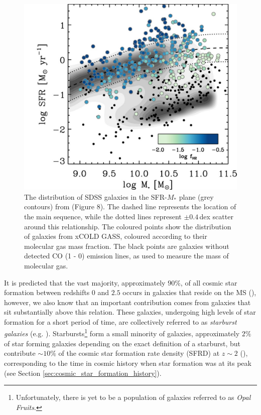 \begin{figure}
    \centering
	\includegraphics[width=0.8\columnwidth]{Figures/saintonge_ms.pdf}
	\caption[The distribution of SDSS galaxies in the SFR-$M_*$ plane]{The distribution of SDSS galaxies in the SFR-$M_*$ plane (grey contours) from \citealt{Saintonge_2017} (Figure 8). The dashed line represents the location of the main sequence, while the dotted lines represent $\pm0.4\,$dex scatter around this relationship. The coloured points show the distribution of galaxies from xCOLD GASS, coloured according to their molecular gas mass fraction. The black points are galaxies without detected CO (1 - 0) emission lines, as used to measure the mass of molecular gas.}
	\label{fig:star_forming_main_sequence}
\end{figure}

It is predicted that the vast majority, approximately $90\%$, of all cosmic star formation between redshifts $0$ and $2.5$ occurs in galaxies that reside on the MS (\citealt{Rodighiero_2011, Sargent_2012}), however, we also know that an important contribution comes from galaxies that sit substantially above this relation. These galaxies, undergoing high levels of star formation for a short period of time, are collectively referred to as \textit{starburst galaxies} (e.g. \citealt{Muxlow_2006, Rinaldi_2022}). Starbursts\footnote{Unfortunately, there is yet to be a population of galaxies referred to as \textit{Opal Fruits}.} form a small minority of galaxies, approximately $2\%$ of star forming galaxies depending on the exact definition of a starburst, but contribute $\sim 10\%$ of the cosmic star formation rate density (SFRD) at $z \sim 2$ (\citealt{Rodighiero_2011}), corresponding to the time in cosmic history when star formation was at its peak (see Section \ref{sec:cosmic_star_formation_history}).

